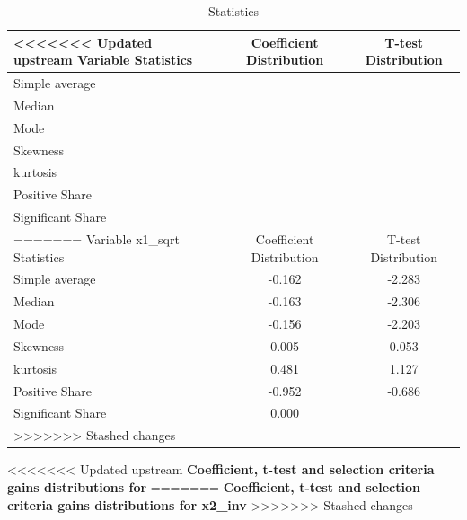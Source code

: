 \documentclass{article}
\begin{document}
\begin{table}[!h]
    \centering
    \caption{Statistics}
    \begin{tabular}{|l|c|c|}
    \hline
<<<<<<< Updated upstream
    Variable  Statistics &  Coefficient Distribution &  T-test Distribution  \\
    \hline
    \hline
    Simple average    &       &  \\
    \hline
    Median            &    &  \\
    \hline
    Mode              &      &  \\
    \hline
    Skewness          &       &  \\
    \hline
    kurtosis          &      &  \\
    \hline
    Positive Share    &      &  \\
    \hline
    Significant Share &  &  \\
=======
    Variable x1_sqrt Statistics &  Coefficient Distribution &  T-test Distribution  \\
    \hline
    \hline
    Simple average    & -0.162      & -2.283 \\
    \hline
    Median            & -0.163   & -2.306 \\
    \hline
    Mode              & -0.156     & -2.203 \\
    \hline
    Skewness          & 0.005      & 0.053 \\
    \hline
    kurtosis          & 0.481     & 1.127 \\
    \hline
    Positive Share    & -0.952     & -0.686 \\
    \hline
    Significant Share & 0.000 &  \\
>>>>>>> Stashed changes
    \hline
    \end{tabular}
\end{table}

\clearpage
\begin{center}
<<<<<<< Updated upstream
    \large{\textbf{Coefficient, t-test and selection criteria gains distributions for  }}
=======
    \large{\textbf{Coefficient, t-test and selection criteria gains distributions for x2_inv }}
>>>>>>> Stashed changes
\end{center}

\vspace{-5mm}
\end{document}
